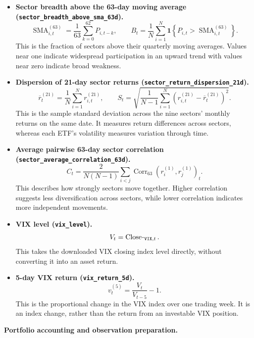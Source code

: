 \documentclass[11pt,letterpaper]{article}
\begin{document}
\begin{itemize}
  \item \textbf{Sector breadth above the 63-day moving average
  (\texttt{sector\_breadth\_above\_sma\_63d}).}
  \[
    \operatorname{SMA}_{i,t}^{(63)}=
      \frac{1}{63}\sum_{k=0}^{62}P_{i,t-k},
    \qquad
    B_t=\frac{1}{N}\sum_{i=1}^{N}
      \mathbf{1}\!\left\{P_{i,t}>\operatorname{SMA}_{i,t}^{(63)}\right\}.
  \]
  This is the fraction of sectors above their quarterly moving averages.
  Values near one indicate widespread participation in an upward trend with
  values near zero indicate broad weakness.

  \item \textbf{Dispersion of 21-day sector returns
  (\texttt{sector\_return\_dispersion\_21d}).}
  \[
    \overline r_t^{(21)}=\frac{1}{N}\sum_{i=1}^{N}r^{(21)}_{i,t},
    \qquad
    S_t=\sqrt{\frac{1}{N-1}\sum_{i=1}^{N}
      (r^{(21)}_{i,t}-\overline r_t^{(21)})^2}.
  \]
  This is the sample standard deviation across the nine sectors' monthly
  returns on the same date. It measures return differences across sectors, whereas each ETF's
  volatility measures variation through time.

  \item \textbf{Average pairwise 63-day sector correlation
  (\texttt{sector\_average\_correlation\_63d}).}
  \[
    C_t=\frac{2}{N(N-1)}\sum_{i<j}
      \operatorname{Corr}_{63}(r^{(1)}_i,r^{(1)}_j)_t.
  \]
  This describes how strongly sectors move together. Higher
  correlation suggests less diversification across sectors, while lower
  correlation indicates more independent movements.

  \item \textbf{VIX level (\texttt{vix\_level}).}
  \[
    V_t=\operatorname{Close}_{\texttt{\string^VIX},t}.
  \]
  This takes the downloaded VIX closing index level directly, without
  converting it into an asset return.

  \item \textbf{5-day VIX return (\texttt{vix\_return\_5d}).}
  \[
    v_t^{(5)}=\frac{V_t}{V_{t-5}}-1.
  \]
  This is the proportional change in the VIX index over one trading week.
  It is an index change, rather than the return from an investable VIX position.
\end{itemize}

\textbf{Portfolio accounting and observation preparation.}
\end{document}
